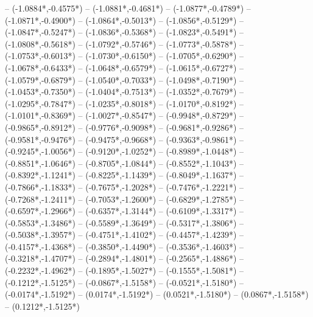 {	-- ({-1.0884*\dx},{-0.4575*\dy})
	-- ({-1.0881*\dx},{-0.4681*\dy})
	-- ({-1.0877*\dx},{-0.4789*\dy})
	-- ({-1.0871*\dx},{-0.4900*\dy})
	-- ({-1.0864*\dx},{-0.5013*\dy})
	-- ({-1.0856*\dx},{-0.5129*\dy})
	-- ({-1.0847*\dx},{-0.5247*\dy})
	-- ({-1.0836*\dx},{-0.5368*\dy})
	-- ({-1.0823*\dx},{-0.5491*\dy})
	-- ({-1.0808*\dx},{-0.5618*\dy})
	-- ({-1.0792*\dx},{-0.5746*\dy})
	-- ({-1.0773*\dx},{-0.5878*\dy})
	-- ({-1.0753*\dx},{-0.6013*\dy})
	-- ({-1.0730*\dx},{-0.6150*\dy})
	-- ({-1.0705*\dx},{-0.6290*\dy})
	-- ({-1.0678*\dx},{-0.6433*\dy})
	-- ({-1.0648*\dx},{-0.6579*\dy})
	-- ({-1.0615*\dx},{-0.6727*\dy})
	-- ({-1.0579*\dx},{-0.6879*\dy})
	-- ({-1.0540*\dx},{-0.7033*\dy})
	-- ({-1.0498*\dx},{-0.7190*\dy})
	-- ({-1.0453*\dx},{-0.7350*\dy})
	-- ({-1.0404*\dx},{-0.7513*\dy})
	-- ({-1.0352*\dx},{-0.7679*\dy})
	-- ({-1.0295*\dx},{-0.7847*\dy})
	-- ({-1.0235*\dx},{-0.8018*\dy})
	-- ({-1.0170*\dx},{-0.8192*\dy})
	-- ({-1.0101*\dx},{-0.8369*\dy})
	-- ({-1.0027*\dx},{-0.8547*\dy})
	-- ({-0.9948*\dx},{-0.8729*\dy})
	-- ({-0.9865*\dx},{-0.8912*\dy})
	-- ({-0.9776*\dx},{-0.9098*\dy})
	-- ({-0.9681*\dx},{-0.9286*\dy})
	-- ({-0.9581*\dx},{-0.9476*\dy})
	-- ({-0.9475*\dx},{-0.9668*\dy})
	-- ({-0.9363*\dx},{-0.9861*\dy})
	-- ({-0.9245*\dx},{-1.0056*\dy})
	-- ({-0.9120*\dx},{-1.0252*\dy})
	-- ({-0.8989*\dx},{-1.0448*\dy})
	-- ({-0.8851*\dx},{-1.0646*\dy})
	-- ({-0.8705*\dx},{-1.0844*\dy})
	-- ({-0.8552*\dx},{-1.1043*\dy})
	-- ({-0.8392*\dx},{-1.1241*\dy})
	-- ({-0.8225*\dx},{-1.1439*\dy})
	-- ({-0.8049*\dx},{-1.1637*\dy})
	-- ({-0.7866*\dx},{-1.1833*\dy})
	-- ({-0.7675*\dx},{-1.2028*\dy})
	-- ({-0.7476*\dx},{-1.2221*\dy})
	-- ({-0.7268*\dx},{-1.2411*\dy})
	-- ({-0.7053*\dx},{-1.2600*\dy})
	-- ({-0.6829*\dx},{-1.2785*\dy})
	-- ({-0.6597*\dx},{-1.2966*\dy})
	-- ({-0.6357*\dx},{-1.3144*\dy})
	-- ({-0.6109*\dx},{-1.3317*\dy})
	-- ({-0.5853*\dx},{-1.3486*\dy})
	-- ({-0.5589*\dx},{-1.3649*\dy})
	-- ({-0.5317*\dx},{-1.3806*\dy})
	-- ({-0.5038*\dx},{-1.3957*\dy})
	-- ({-0.4751*\dx},{-1.4102*\dy})
	-- ({-0.4457*\dx},{-1.4239*\dy})
	-- ({-0.4157*\dx},{-1.4368*\dy})
	-- ({-0.3850*\dx},{-1.4490*\dy})
	-- ({-0.3536*\dx},{-1.4603*\dy})
	-- ({-0.3218*\dx},{-1.4707*\dy})
	-- ({-0.2894*\dx},{-1.4801*\dy})
	-- ({-0.2565*\dx},{-1.4886*\dy})
	-- ({-0.2232*\dx},{-1.4962*\dy})
	-- ({-0.1895*\dx},{-1.5027*\dy})
	-- ({-0.1555*\dx},{-1.5081*\dy})
	-- ({-0.1212*\dx},{-1.5125*\dy})
	-- ({-0.0867*\dx},{-1.5158*\dy})
	-- ({-0.0521*\dx},{-1.5180*\dy})
	-- ({-0.0174*\dx},{-1.5192*\dy})
	-- ({0.0174*\dx},{-1.5192*\dy})
	-- ({0.0521*\dx},{-1.5180*\dy})
	-- ({0.0867*\dx},{-1.5158*\dy})
	-- ({0.1212*\dx},{-1.5125*\dy})
}

